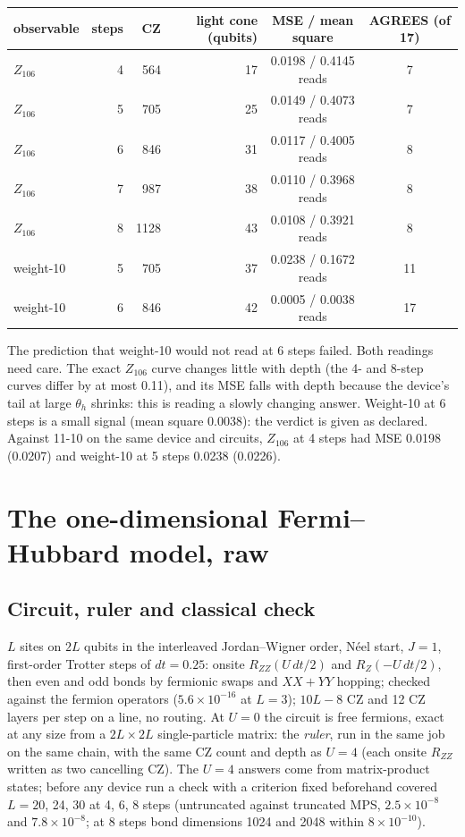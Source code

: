 \documentclass[10pt,a4paper]{article}
\begin{document}
\begin{center}\small
\begin{tabular}{lrrrcc}
\toprule
observable & steps & CZ & light cone (qubits) & MSE / mean square & AGREES (of 17) \\
\midrule
$Z_{106}$ & 4 & 564 & 17 & 0.0198 / 0.4145 reads & 7 \\
$Z_{106}$ & 5 & 705 & 25 & 0.0149 / 0.4073 reads & 7 \\
$Z_{106}$ & 6 & 846 & 31 & 0.0117 / 0.4005 reads & 8 \\
$Z_{106}$ & 7 & 987 & 38 & 0.0110 / 0.3968 reads & 8 \\
$Z_{106}$ & 8 & 1128 & 43 & 0.0108 / 0.3921 reads & 8 \\
weight-10 & 5 & 705 & 37 & 0.0238 / 0.1672 reads & 11 \\
weight-10 & 6 & 846 & 42 & 0.0005 / 0.0038 reads & 17 \\
\bottomrule
\end{tabular}
\end{center}

The prediction that weight-10 would not read at 6 steps failed. Both readings need care. The exact $Z_{106}$ curve
changes little with depth (the 4- and 8-step curves differ by at most 0.11), and its MSE falls with depth because the
device's tail at large $\theta_h$ shrinks: this is reading a slowly changing answer. Weight-10 at 6 steps is a small
signal (mean square 0.0038): the verdict is given as declared. Against 11-10 on the same device and circuits,
$Z_{106}$ at 4 steps had MSE 0.0198 (0.0207) and weight-10 at 5 steps 0.0238 (0.0226).

\section{The one-dimensional Fermi--Hubbard model, raw}\label{sec:hubbard}
\subsection{Circuit, ruler and classical check}
$L$ sites on $2L$ qubits in the interleaved Jordan--Wigner order, N\'eel start, $J = 1$, first-order Trotter steps of
$dt = 0.25$: onsite $R_{ZZ}(U\,dt/2)$ and $R_Z(-U\,dt/2)$, then even and odd bonds by fermionic swaps and $XX+YY$
hopping; checked against the fermion operators ($5.6\times10^{-16}$ at $L = 3$); $10L-8$ CZ and 12 CZ layers per step
on a line, no routing. At $U = 0$ the circuit is free fermions, exact at any size from a $2L\times2L$ single-particle
matrix: the \emph{ruler}, run in the same job on the same chain, with the same CZ count and depth as $U = 4$ (each
onsite $R_{ZZ}$ written as two cancelling CZ). The $U = 4$ answers come from matrix-product states; before any device
run a check with a criterion fixed beforehand covered $L = 20$, 24, 30 at 4, 6, 8 steps (untruncated against truncated
MPS, $2.5\times10^{-8}$ and $7.8\times10^{-8}$; at 8 steps bond dimensions 1024 and 2048 within $8\times10^{-10}$).
\end{document}
